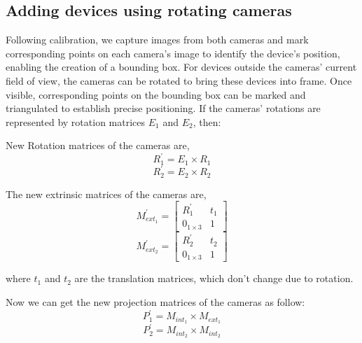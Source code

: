 \subsection{Adding devices using rotating cameras}
Following calibration, we capture images from both cameras and mark corresponding points on each camera's image to identify the device's position, enabling the creation of a bounding box. For devices outside the cameras' current field of view, the cameras can be rotated to bring these devices into frame. Once visible, corresponding points on the bounding box can be marked and triangulated to establish precise positioning.
If the cameras' rotations are represented by rotation matrices $E_1$ and $E_2$, then:

New Rotation matrices of the cameras are,
\[
	R_1^\prime = E_1 \times R_1
\]
\[
	R_2^\prime = E_2 \times R_2
\]

The new extrinsic matrices of the cameras are,
\[
	M_{ext_1}^\prime =  \begin{bmatrix}
		R_1^\prime   & t_1 \\
		0_{1\times3} & 1
	\end{bmatrix}
\]
\[
	M_{ext_2}^\prime =  \begin{bmatrix}
		R_2^\prime   & t_2 \\
		0_{1\times3} & 1
	\end{bmatrix}
\]

where $t_1$ and $t_2$ are the translation matrices, which don't change due to rotation.

Now we can get the new projection matrices of the cameras as follow:
\[
	P_1^\prime = M_{int_1} \times M_{ext_1}
\]
\[
	P_2^\prime = M_{int_2} \times M_{int_2}
\]
